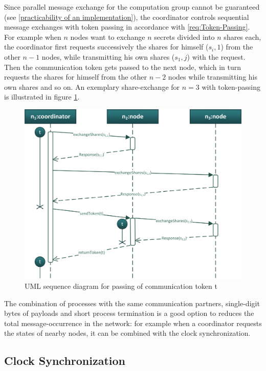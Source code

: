 Since parallel message exchange for the computation group cannot be guaranteed (see \autoref{practicability of an implementation}), the coordinator controls sequential message exchanges with token passing in accordance with \ref{req:Token-Passing}. For example when $n$ nodes want to exchange $n$ secrets divided into $n$ shares each, the coordinator first requests successively the shares for himself ($s_i,1$) from the other $n-1$ nodes, while transmitting his own shares ($s_1,j$) with the request. Then the communication token gets passed to the next node, which in turn requests the shares for himself from the other $n-2$ nodes while transmitting his own shares and so on. An exemplary share-exchange for $n=3$ with token-passing is illustrated in figure \ref{figure:coordinator token passing}.

\begin{figure}[!htb] %
	\caption{\gls{UML} sequence diagram for passing of communication token t} \label{figure:coordinator token passing}
	\includegraphics[scale=1.0]{figures/token-passing-ion.png}
\end{figure}

The combination of processes with the same communication partners, single-digit bytes of payloads and short process termination is a good option to reduces the total message-occurrence in the network: for example when a coordinator requests the states of nearby nodes, it can be combined with the clock synchronization.

\subsection{Clock Synchronization} \label{Clock synchronization}

